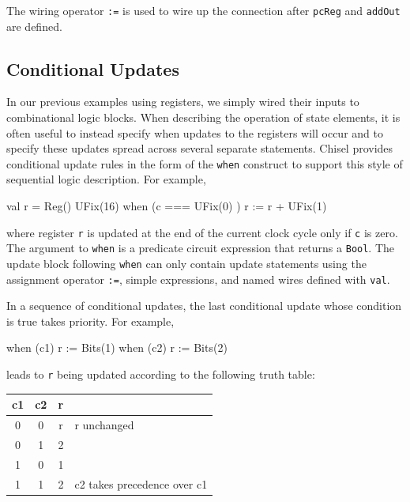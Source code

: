 \documentclass[twocolumn,10pt]{article}
\def\code#1{{\tt #1}}
\begin{document}
\noindent
The wiring operator
\verb!:=! is used to wire up
the connection after \verb!pcReg! and \verb!addOut! are defined.

\subsection{Conditional Updates}

In our previous examples using registers, we simply wired their inputs
to combinational logic blocks.  When describing the operation of state
elements, it is often useful to instead specify when updates to the
registers will occur and to specify these updates spread across
several separate statements.  Chisel provides conditional update rules
in the form of the \code{when} construct to support this style of
sequential logic description. For example,
\begin{scala}
val r = Reg() { UFix(16) }
when (c === UFix(0) ) {
  r := r + UFix(1)
}
\end{scala}

\noindent
where register \code{r} is updated at the end of the current clock
cycle only if \verb+c+ is zero.  The argument to \code{when} is a
predicate circuit expression that returns a \code{Bool}.  The update
block following \code{when} can only contain update statements using
the assignment operator \verb+:=+, simple expressions, and named wires
defined with \code{val}.

In a sequence of conditional updates, the last conditional update
whose condition is true takes priority.  For example,
\begin{scala}
when (c1) { r := Bits(1) }
when (c2) { r := Bits(2) }
\end{scala}

\noindent
leads to \code{r} being updated according to the following truth table:
\begin{center}
{\small
\begin{tabular}{|c|c|c|l|}
\hline
c1 & c2  &  r & \\
\hline
0 &  0 & r &  r unchanged \\
0 &  1 & 2 & \\
1 &  0 & 1 & \\
1 &  1 & 2& c2 takes precedence over c1 \\
\hline
\end{tabular}
}
\end{center}
\end{document}
